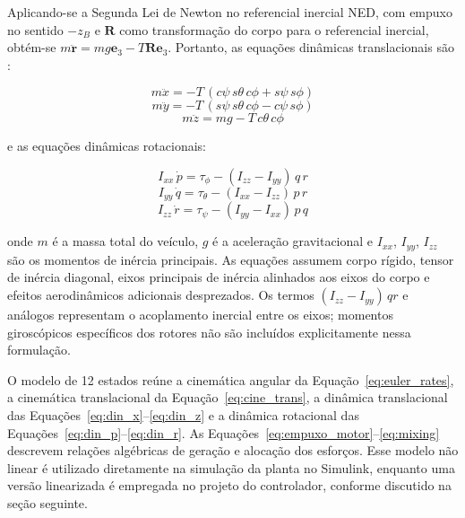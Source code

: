 Aplicando-se a Segunda Lei de Newton no referencial inercial NED, com empuxo no sentido $-z_B$ e $\mathbf{R}$ como transformação do corpo para o referencial inercial, obtém-se $m\ddot{\mathbf{r}}=mg\mathbf{e}_3-T\mathbf{R}\mathbf{e}_3$. Portanto, as equações dinâmicas translacionais são \cite{beard2012}:

\begin{equation}\label{eq:din_x}
m\ddot{x} = -T\,(c\psi\, s\theta\, c\phi + s\psi\, s\phi)
\end{equation}
\begin{equation}\label{eq:din_y}
m\ddot{y} = -T\,(s\psi\, s\theta\, c\phi - c\psi\, s\phi)
\end{equation}
\begin{equation}\label{eq:din_z}
m\ddot{z} = mg - T\, c\theta\, c\phi
\end{equation}

\noindent e as equações dinâmicas rotacionais:

\begin{equation}\label{eq:din_p}
I_{xx}\,\dot{p} = \tau_\phi - (I_{zz} - I_{yy})\,q\,r
\end{equation}
\begin{equation}\label{eq:din_q}
I_{yy}\,\dot{q} = \tau_\theta - (I_{xx} - I_{zz})\,p\,r
\end{equation}
\begin{equation}\label{eq:din_r}
I_{zz}\,\dot{r} = \tau_\psi - (I_{yy} - I_{xx})\,p\,q
\end{equation}

\noindent onde $m$ é a massa total do veículo, $g$ é a aceleração gravitacional e $I_{xx}$, $I_{yy}$, $I_{zz}$ são os momentos de inércia principais. As equações assumem corpo rígido, tensor de inércia diagonal, eixos principais de inércia alinhados aos eixos do corpo e efeitos aerodinâmicos adicionais desprezados. Os termos $(I_{zz} - I_{yy})\,qr$ e análogos representam o acoplamento inercial entre os eixos; momentos giroscópicos específicos dos rotores não são incluídos explicitamente nessa formulação.

O modelo de 12 estados reúne a cinemática angular da Equação~\eqref{eq:euler_rates}, a cinemática translacional da Equação~\eqref{eq:cine_trans}, a dinâmica translacional das Equações~\eqref{eq:din_x}--\eqref{eq:din_z} e a dinâmica rotacional das Equações~\eqref{eq:din_p}--\eqref{eq:din_r}. As Equações~\eqref{eq:empuxo_motor}--\eqref{eq:mixing} descrevem relações algébricas de geração e alocação dos esforços. Esse modelo não linear é utilizado diretamente na simulação da planta no Simulink, enquanto uma versão linearizada é empregada no projeto do controlador, conforme discutido na seção seguinte.

